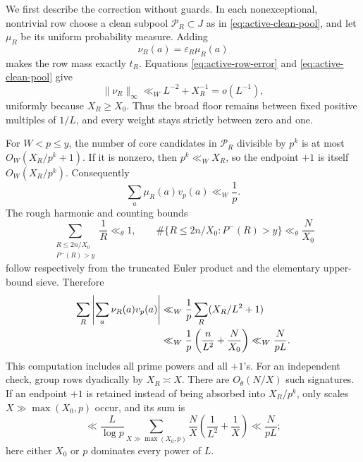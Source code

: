 \documentclass[11pt]{article}
\numberwithin{equation}{section}
\theoremstyle{definition}
\theoremstyle{remark}
\newcommand{\1}{\mathbf 1}
\begin{document}
We first describe the correction without guards.  In each nonexceptional,
nontrivial row choose a clean subpool
\(
 \mathcal P_R\subset J
\)
as in \eqref{eq:active-clean-pool}, and let \(\mu_R\) be its uniform
probability measure.  Adding
\begin{equation}
 \nu_R(a)=\varepsilon_R\mu_R(a)
 \label{eq:rough-row-correction}
\end{equation}
makes the row mass exactly \(t_R\).  Equations
\eqref{eq:active-row-error} and \eqref{eq:active-clean-pool} give
\begin{equation}
 \|\nu_R\|_\infty\ll_W L^{-2}+X_R^{-1}=o(L^{-1}),
 \label{eq:rough-row-correction-slack}
\end{equation}
uniformly because \(X_R\ge X_0\).  Thus the broad floor remains between
fixed positive multiples of \(1/L\), and every weight stays strictly
between zero and one.

For \(W<p\le y\), the number of core candidates in \(\mathcal P_R\)
divisible by \(p^k\) is at most \(O_W(X_R/p^k+1)\).  If it is nonzero,
then \(p^k\ll_W X_R\), so the endpoint \(+1\) is itself
\(O_W(X_R/p^k)\).  Consequently
\begin{equation}
 \sum_a\mu_R(a)v_p(a)\ll_W\frac1p.
 \label{eq:rough-pool-valuation}
\end{equation}
The rough harmonic and counting bounds
\begin{equation}
 \sum_{\substack{R\le2n/X_0\\P^-(R)>y}}\frac1R\ll_\theta1,
 \qquad
 \#\{R\le2n/X_0:P^-(R)>y\}\ll_\theta\frac{N}{X_0}
 \label{eq:rough-row-harmonic-count}
\end{equation}
follow respectively from the truncated Euler product and the elementary
upper-bound sieve.  Therefore
\begin{align}
 \sum_R\left|\sum_a\nu_R(a)v_p(a)\right|
 &\ll_W\frac1p\sum_R(X_R/L^2+1)\notag\\
 &\ll_W\frac1p\left(\frac n{L^2}+\frac{N}{X_0}\right)
 \ll_W\frac{N}{pL}.
 \label{eq:rough-total-row-correction}
\end{align}
This computation includes all prime powers and all \(+1\)'s.  For an
independent check, group rows dyadically by \(X_R\asymp X\).  There are
\(O_\theta(N/X)\) such signatures.  If an endpoint \(+1\) is retained
instead of being absorbed into \(X_R/p^k\), only scales
\(X\gg\max(X_0,p)\) occur, and its sum is
\[
 \ll\frac L{\log p}\sum_{X\gg\max(X_0,p)}
       \frac NX\left(\frac1{L^2}+\frac1X\right)
 \ll\frac{N}{pL};
\]
here either \(X_0\) or \(p\) dominates every power of \(L\).
\end{document}
